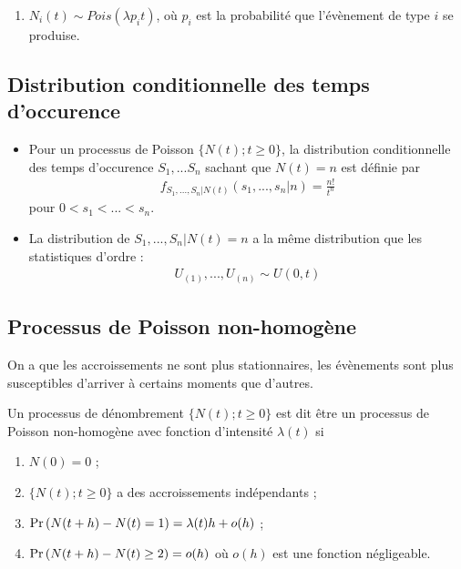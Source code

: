 \documentclass[10pt, french, landscape]{article}
\begin{document}
\begin{multicols*}{2}
\begin{enumerate}[label=\faAngleRight]
\item $N_i(t) \sim Pois(\lambda p_i t)$, où $p_i$ est la probabilité que l'évènement de type $i$ se produise.
\end{enumerate}


\subsection*{Distribution conditionnelle des temps d'occurence}
\begin{itemize}
\item Pour un processus de Poisson $\{ N(t) ; t \geq 0 \}$, la distribution conditionnelle des temps d'occurence $S_1, ... S_n$ sachant que $N(t) = n$ est définie par
\begin{align*}
f_{S_1, ..., S_n | N(t)}(s_1, ..., s_n | n) = \frac{n!}{t^n}
\end{align*}
pour $0 < s_1 < ... < s_n$.

\item La distribution de $S_1, ..., S_n | N(t) = n$ a la même distribution que les statistiques d'ordre : 
\begin{align*}
U_{(1)}, ..., U_{(n)} \sim U(0,t)
\end{align*}
\end{itemize}

\subsection*{Processus de Poisson non-homogène}

On a que les accroissements ne sont plus stationnaires, les évènements sont plus susceptibles d'arriver à certains moments que d'autres.

\begin{definition}[Définition]
Un processus de dénombrement $\{ N(t) ; t \geq 0 \}$ est dit être un processus de Poisson non-homogène avec fonction d'intensité $\lambda(t)$ si
\begin{enumerate}[label=(\arabic*)]
\item $N(0) = 0$ ;
\item $\{ N(t) ; t \geq 0 \}$ a des accroissements indépendants ;
\item $\Pr \left( N(t+h) - N(t) = 1 \right) = \lambda(t) h + o(h)$ ;
\item $\Pr \left( N(t+h) - N(t) \geq 2 \right) = o(h)$ où $o(h)$ est une fonction négligeable.
\end{enumerate}
\end{definition}


\end{multicols*}
\end{document}
